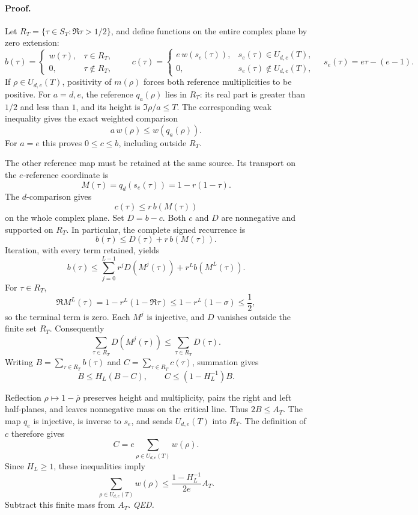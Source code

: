 \paragraph{Proof.}
Let \(R_T=\{\tau\in S_T:\Re\tau>1/2\}\), and define functions on
the entire complex plane by zero extension:
\[
 b(\tau)=
 \begin{cases}w(\tau),&\tau\in R_T,\\0,&\tau\notin R_T,\end{cases}
 \qquad
 c(\tau)=
 \begin{cases}
 e\,w(s_e(\tau)),&s_e(\tau)\in U_{d,e}(T),\\
 0,&s_e(\tau)\notin U_{d,e}(T),
 \end{cases}
 \quad s_e(\tau)=e\tau-(e-1).
\]
If \(\rho\in U_{d,e}(T)\), positivity of \(m(\rho)\) forces both
reference multiplicities to be positive. For \(a=d,e\), the reference
\(q_a(\rho)\) lies in \(R_T\): its real part is greater than \(1/2\)
and less than \(1\), and its height is \(\Im\rho/a\le T\).
The corresponding weak inequality gives the exact weighted comparison
\[
 a\,w(\rho)\le w(q_a(\rho)).
\]
For \(a=e\) this proves \(0\le c\le b\), including outside \(R_T\).

The other reference map must be retained at the same source. Its
transport on the \(e\)-reference coordinate is
\[
 M(\tau)=q_d(s_e(\tau))=1-r(1-\tau).
\]
The \(d\)-comparison gives
\[
 c(\tau)\le r\,b(M(\tau))
\]
on the whole complex plane. Set \(D=b-c\). Both \(c\) and \(D\) are
nonnegative and supported on \(R_T\). In particular, the complete signed
recurrence is
\[
 b(\tau)\le D(\tau)+r\,b(M(\tau)).
\]
Iteration, with every term retained, yields
\[
 b(\tau)\le
 \sum_{j=0}^{L-1}r^jD(M^j(\tau))
 +r^Lb(M^L(\tau)).
\]
For \(\tau\in R_T\),
\[
 \Re M^L(\tau)=1-r^L(1-\Re\tau)
 \le1-r^L(1-\sigma)\le\frac12,
\]
so the terminal term is zero. Each \(M^j\) is injective, and \(D\)
vanishes outside the finite set \(R_T\). Consequently
\[
 \sum_{\tau\in R_T}D(M^j(\tau))
 \le\sum_{\tau\in R_T}D(\tau).
\]
Writing \(B=\sum_{\tau\in R_T}b(\tau)\) and
\(C=\sum_{\tau\in R_T}c(\tau)\), summation gives
\[
 B\le H_L(B-C),\qquad C\le(1-H_L^{-1})B.
\]

Reflection \(\rho\mapsto1-\overline{\rho}\) preserves height and
multiplicity, pairs the right and left half-planes, and leaves
nonnegative mass on the critical line. Thus \(2B\le A_T\).
The map \(q_e\) is injective, is inverse to \(s_e\), and sends
\(U_{d,e}(T)\) into \(R_T\). The definition of \(c\) therefore gives
\[
 C=e\sum_{\rho\in U_{d,e}(T)}w(\rho).
\]
Since \(H_L\ge1\), these inequalities imply
\[
 \sum_{\rho\in U_{d,e}(T)}w(\rho)
 \le\frac{1-H_L^{-1}}{2e}A_T.
\]
Subtract this finite mass from \(A_T\).
\hfill\textit{QED.}

